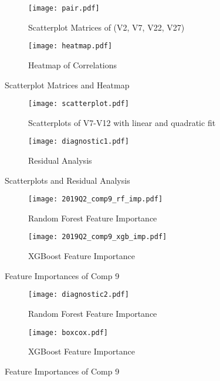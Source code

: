 \documentclass[11pt a4paper]{article}
\begin{document}
	
	
	\begin{figure}[H]
		\centering
		\begin{subfigure}{.5\textwidth}
			\centering
			\texttt{[image: pair.pdf]}
			\caption{Scatterplot Matrices of (V2, V7, V22, V27)}
			\label{fig:pair}
		\end{subfigure}%
		\begin{subfigure}{.5\textwidth}
			\centering
			\texttt{[image: heatmap.pdf]}
			\caption{Heatmap of Correlations}
			\label{fig:heatmap}
		\end{subfigure}
		\caption{Scatterplot Matrices and Heatmap}
		\label{fig: eda-2}
	\end{figure}
	
	\begin{figure}[H]
		\centering
		\begin{subfigure}{.5\textwidth}
			\centering
			\texttt{[image: scatterplot.pdf]}
			\caption{Scatterplots of V7-V12 with linear and quadratic fit}
			\label{fig:scatterplot}
		\end{subfigure}%
		\begin{subfigure}{.5\textwidth}
			\centering
			\texttt{[image: diagnostic1.pdf]}
			\caption{Residual Analysis}
			\label{fig:diagnostic-0}
		\end{subfigure}
		\caption{Scatterplots and Residual Analysis}
		\label{fig:eda-3}
	\end{figure}
	
	\begin{figure}[H]
		\centering
		\begin{subfigure}{.5\textwidth}
			\centering
			\texttt{[image: 2019Q2\_comp9\_rf\_imp.pdf]}
			\caption{Random Forest Feature Importance}
			\label{fig:rf_imp}
		\end{subfigure}%
		\begin{subfigure}{.5\textwidth}
			\centering
			\texttt{[image: 2019Q2\_comp9\_xgb\_imp.pdf]}
			\caption{XGBoost Feature Importance}
			\label{fig:xgb_imp}
		\end{subfigure}
		\caption{Feature Importances of Comp 9}
		\label{fig:comp9_imp}
	\end{figure}
	
	
	
	\begin{figure}[H]
		\centering
		\begin{subfigure}{.5\textwidth}
			\centering
			\texttt{[image: diagnostic2.pdf]}
			\caption{Random Forest Feature Importance}
			\label{fig:diagnostic-2}
		\end{subfigure}%
		\begin{subfigure}{.5\textwidth}
			\centering
			\texttt{[image: boxcox.pdf]}
			\caption{XGBoost Feature Importance}
			\label{fig:boxcox}
		\end{subfigure}
		\caption{Feature Importances of Comp 9}
		\label{fig:Final Model Diagnostics}
	\end{figure}
	
\end{document}
